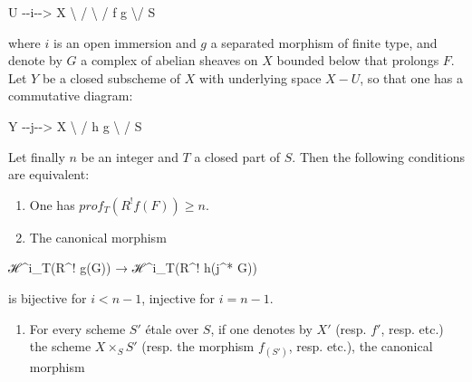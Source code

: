 \documentclass[
]{article}
\newenvironment{Shaded}{}{}
\newcommand{\NormalTok}[1]{#1}
\providecommand{\tightlist}{%
  \setlength{\itemsep}{0pt}\setlength{\parskip}{0pt}}
\begin{document}
\begin{Shaded}
\begin{Highlighting}[]
\NormalTok{U {-}{-}i{-}{-}\textgreater{} X}
\NormalTok{ \textbackslash{}      /}
\NormalTok{  \textbackslash{}    /}
\NormalTok{   f  g}
\NormalTok{    \textbackslash{}/}
\NormalTok{    S}
\end{Highlighting}
\end{Shaded}

where \(i\) is an open immersion and \(g\) a separated morphism of
finite type, and denote by \(G\) a complex of abelian sheaves on \(X\)
bounded below that prolongs \(F\). Let \(Y\) be a closed subscheme of
\(X\) with underlying space \(X - U\), so that one has a commutative
diagram:

\begin{Shaded}
\begin{Highlighting}[]
\NormalTok{Y {-}{-}j{-}{-}\textgreater{} X}
\NormalTok{ \textbackslash{}      /}
\NormalTok{  h    g}
\NormalTok{   \textbackslash{}  /}
\NormalTok{    S}
\end{Highlighting}
\end{Shaded}

Let finally \(n\) be an integer and \(T\) a closed part of \(S\). Then
the following conditions are equivalent:

\begin{enumerate}
\def\labelenumi{(\roman{enumi})}
\item
  One has \(prof_{T}(R^{!} f(F)) \geqslant n\).
\item
  The canonical morphism
\end{enumerate}

\begin{Shaded}
\begin{Highlighting}[]
\NormalTok{ℋ\^{}i\_T(R\^{}! g(G)) → ℋ\^{}i\_T(R\^{}! h(j\^{}* G))}
\end{Highlighting}
\end{Shaded}

is bijective for \(i < n - 1\), injective for \(i = n - 1\).

\begin{enumerate}
\def\labelenumi{(\roman{enumi})}
\setcounter{enumi}{2}
\tightlist
\item
  For every scheme \(S'\) étale over \(S\), if one denotes by \(X'\)
  (resp. \(f'\), resp. etc.) the scheme \(X \times_{S} S'\) (resp. the
  morphism \(f_{(S')}\), resp. etc.), the canonical morphism
\end{enumerate}
\end{document}
